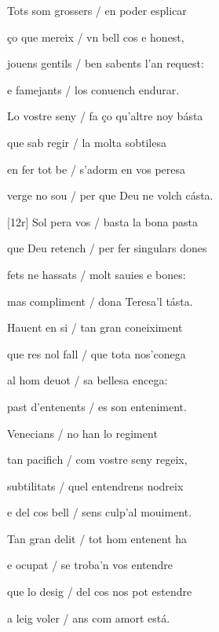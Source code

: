 \documentclass[12pt]{article}
\begin{document}
\begin{estrofa}

 Tots som grossers / en poder esplicar

 \c{c}o que mereix / vn bell cos e honest,

 jouens gentils / ben sabents l'an request:

 e famejants / los conuench endurar.

 Lo vostre seny / fa \c{c}o qu'altre noy b\'{a}sta

 que sab regir / la molta sobtilesa

 en fer tot be / s'adorm en vos peresa

 verge no sou / per que Deu ne volch c\'{a}sta.

\end{estrofa}



\begin{estrofa}

 [12r] Sol pera vos / basta la bona pasta

 que Deu retench / per fer singulars dones

 fets ne hassats / molt sauies e bones:

 mas compliment / dona Teresa'l t\'{a}sta.

 Hauent en si / tan gran coneiximent

 que res nol fall / que tota nos'conega

 al hom deuot / sa bellesa encega:

 past d'entenents / es son enteniment.

\end{estrofa}



\begin{estrofa}

 Venecians / no han lo regiment

 tan pacifich / com vostre seny regeix,

 subtilitats / quel entendrens nodreix

 e del cos bell / sens culp'al mouiment.

 Tan gran delit / tot hom entenent ha

 e ocupat / se troba'n vos entendre

 que lo desig / del cos nos pot estendre

 a leig voler / ans com amort est\'{a}.

\end{estrofa}
\end{document}
